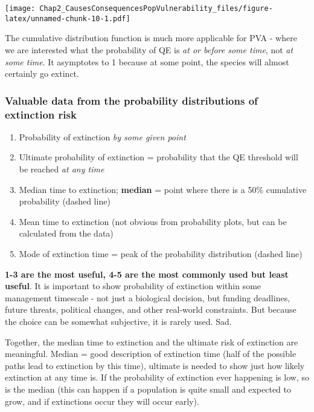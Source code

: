 \documentclass[]{article}
\providecommand{\tightlist}{%
  \setlength{\itemsep}{0pt}\setlength{\parskip}{0pt}}
\begin{document}
\texttt{[image: Chap2\_CausesConsequencesPopVulnerability\_files/figure-latex/unnamed-chunk-10-1.pdf]}

The cumulative distribution function is much more applicable for PVA -
where we are interested what the probability of QE is \emph{at or before
some time}, not \emph{at some time}. It asymptotes to 1 because at some
point, the species will almost certainly go extinct.

\subsubsection{Valuable data from the probability distributions of
extinction
risk}\label{valuable-data-from-the-probability-distributions-of-extinction-risk}

\begin{enumerate}
\def\labelenumi{\arabic{enumi}.}
\tightlist
\item
  Probability of extinction \emph{by some given point}
\item
  Ultimate probability of extinction = probability that the QE threshold
  will be reached \emph{at any time}
\item
  Median time to extinction; \textbf{median} = point where there is a
  50\% cumulative probability (dashed line)
\item
  Mean time to extinction (not obvious from probability plots, but can
  be calculated from the data)
\item
  Mode of extinction time = peak of the probability distribution (dashed
  line)
\end{enumerate}

\textbf{1-3 are the most useful, 4-5 are the most commonly used but
least useful}. It is important to show probability of extinction within
some management timescale - not just a biological decision, but funding
deadlines, future threats, political changes, and other real-world
constraints. But because the choice can be somewhat subjective, it is
rarely used. Sad.

Together, the median time to extinction and the ultimate risk of
extinction are meaningful. Median = good description of extinction time
(half of the possible paths lead to extinction by this time), ultimate
is needed to show just how likely extinction at any time is. If the
probability of extinction ever happening is low, so is the median (this
can happen if a population is quite small and expected to grow, and if
extinctions occur they will occur early).
\end{document}
